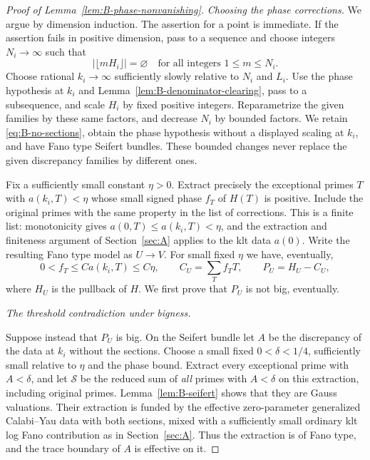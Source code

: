 \begin{proof}[Proof of Lemma~\ref{lem:B-phase-nonvanishing}]
\emph{Choosing the phase corrections.}
We argue by dimension induction.  The assertion for a point is
immediate.  If the assertion fails in positive dimension, pass to
a sequence and choose integers $N_i\to\infty$ such that
\begin{equation}\label{eq:B-no-sections}
 |\lfloor mH_i\rfloor|=\varnothing
 \quad\text{for all integers }1\le m\le N_i.
\end{equation}
Choose rational $k_i\to\infty$ sufficiently slowly relative to
$N_i$ and $L_i$.  Use the phase hypothesis at $k_i$ and
Lemma~\ref{lem:B-denominator-clearing}, pass to a subsequence,
and scale $H_i$ by fixed positive integers.  Reparametrize the
given families by these same factors, and decrease $N_i$ by
bounded factors.  We retain \eqref{eq:B-no-sections}, obtain the
phase hypothesis without a displayed scaling at $k_i$, and have
Fano type Seifert bundles.  These bounded changes never replace
the given discrepancy families by different ones.

Fix a sufficiently small constant $\eta>0$.  Extract precisely
the exceptional primes $T$ with $a(k_i,T)<\eta$ whose small signed
phase $f_T$ of $H(T)$ is positive.  Include the original primes
with the same property in the list of corrections.  This is a
finite list: monotonicity gives $a(0,T)\le a(k_i,T)<\eta$, and
the extraction and finiteness argument of
Section~\ref{sec:A} applies to the klt data $a(0)$.
Write the resulting Fano type model as $U\to V$.  For small fixed
$\eta$ we have, eventually,
\begin{equation}\label{eq:B-positive-corrections}
 0<f_T\le C a(k_i,T)\le C\eta,
 \qquad
 C_U=\sum_T f_TT,
 \qquad P_U=H_U-C_U,
\end{equation}
where $H_U$ is the pullback of $H$.
We first prove that $P_U$ is not big, eventually.

\medskip
\noindent\emph{The threshold contradiction under bigness.}

Suppose instead that $P_U$ is big.  On the Seifert bundle let $A$
be the discrepancy of the data at $k_i$ without the sections.
Choose a small fixed $0<\delta<1/4$, sufficiently small relative
to $\eta$ and the phase bound.  Extract every exceptional prime
with $A<\delta$, and let $\mathcal S$ be the reduced sum of
\emph{all} primes with $A<\delta$ on this extraction, including
original primes.  Lemma~\ref{lem:B-seifert} shows that they are
Gauss valuations.  Their extraction is funded by the effective
zero-parameter generalized Calabi--Yau data with both sections,
mixed with a sufficiently small ordinary klt log Fano
contribution as in Section~\ref{sec:A}.  Thus the extraction is
of Fano type, and the trace boundary of $A$ is effective on it.


\end{proof}
